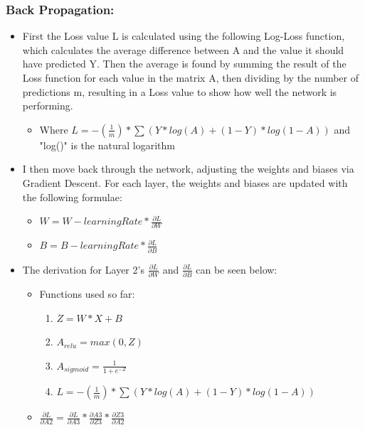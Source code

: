 \documentclass[./project-report/src/latex/project-report.tex]{subfiles}
\begin{document}
\subsubsection{Back Propagation:}

\begin{itemize}
    \item First the Loss value L is calculated using the following Log-Loss function, which calculates the average difference between A and the value it should have 
          predicted Y. Then the average is found by summing the result of the Loss function for each value in the matrix A, then dividing by the number of predictions m, 
          resulting in a Loss value to show how well the network is performing.
    \begin{itemize}
        \item Where $L = -(\frac{1}{m}) * \sum(Y * log(A) + (1-Y) * log(1-A))$ and "log()" is the natural logarithm
    \end{itemize}
    \item I then move back through the network, adjusting the weights and biases via Gradient Descent. For each layer, the weights and biases are updated with the 
          following formulae:
    \begin{itemize}
        \item $W = W - learningRate * \frac{\partial{L}}{\partial{W}}$
        \item $B = B - learningRate * \frac{\partial{L}}{\partial{B}}$
    \end{itemize}
    \item The derivation for Layer 2's $\frac{\partial{L}}{\partial{W}}$ and $\frac{\partial{L}}{\partial{B}}$ can be seen below:
    \begin{itemize}
        \item Functions used so far:
        \begin{enumerate}
            \item $Z = W * X + B$
            \item $A_{relu} = max(0, Z)$
            \item $A_{sigmoid} = \frac{1}{1+e^{-Z}}$
            \item $L = -(\frac{1}{m}) * \sum(Y * log(A) + (1-Y) * log(1-A))$
        \end{enumerate}
        \item $\frac{\partial{L}}{\partial{A2}} = \frac{\partial{L}}{\partial{A3}} * \frac{\partial{A3}}{\partial{Z3}} * \frac{\partial{Z3}}{\partial{A2}}$
              \vspace{1mm}

\end{itemize}
\end{itemize}
\end{document}
